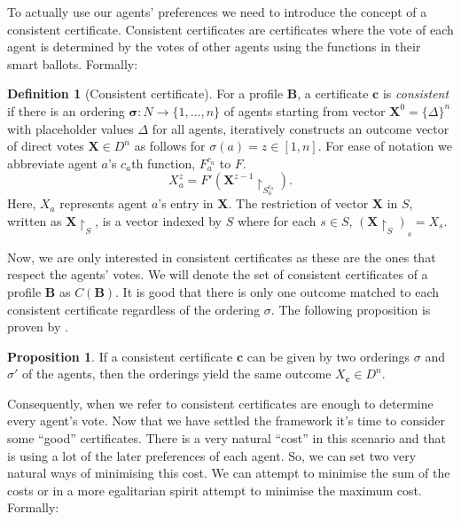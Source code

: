 \documentclass[11pt,a4paper, titlepage]{article}
\theoremstyle{definition}
\newtheorem{definition}[theorem]{Definition}
\newtheorem{proposition}[theorem]{Proposition}
\let\vec\mathbf
\begin{document}
To actually use our agents' preferences we need to introduce the concept of a consistent certificate. 
Consistent certificates are certificates where the vote of each agent is determined by the votes of other agents using the functions in their smart ballots. Formally:

\begin{definition}[Consistent certificate]
    For a profile $\mathbf{B}$, a certificate $\mathbf{c}$ is \emph{consistent} if there is an ordering $\mathbf{\sigma} \colon N \longrightarrow \{1,\ldots, n\}$ of agents starting from vector $\vec{X}^0 = \{\Delta\}^n$ with placeholder values $\Delta$ for all agents, iteratively constructs an outcome vector of direct votes $\vec{X} \in D^n$ as follows for $\sigma(a) = z \in [1,n]$. For ease of notation we abbreviate agent $a$'s $c_a$th function, $F_a^{c_a}$ to $F$.
    \[
        X^z_a = F'(\vec{X}^{z-1} \restriction_{S^{c_a}_a} ).
    \]
    Here, $X_a$ represents agent $a$'s entry in $\vec{X}$. 
    The restriction of vector $\vec{X}$ in $S$, written as $\vec{X} \restriction_S$, is a vector indexed by $S$ where for each $s \in S$,  $(\vec{X} \restriction_S)_s = X_s$.


\end{definition}


Now, we are only interested in consistent certificates as these are the ones that respect the agents' votes. We will denote the set of consistent certificates of a profile $\mathbf{B}$ as $C(\mathbf{B})$.
It is good that there is only one outcome matched to each consistent certificate regardless of the ordering $\sigma$. The following proposition is proven by \cite{grandi}.

\begin{proposition}
    If a consistent certificate $\mathbf{c}$ can be given by two orderings $\sigma$ and $\sigma'$ of the agents, then the orderings yield the same outcome $X_\mathbf{c} \in D^n$.
\end{proposition}

Consequently, when we refer to consistent certificates are enough to determine every agent's vote. 
Now that we have settled the framework it's time to consider some ``good'' certificates. 
There is a very natural ``cost'' in this scenario and that is using a lot of the later preferences of each agent. 
So, we can set two very natural ways of minimising this cost. 
We can attempt to minimise the sum of the costs or in a more egalitarian spirit attempt to minimise the maximum cost. 
Formally:
\end{document}
